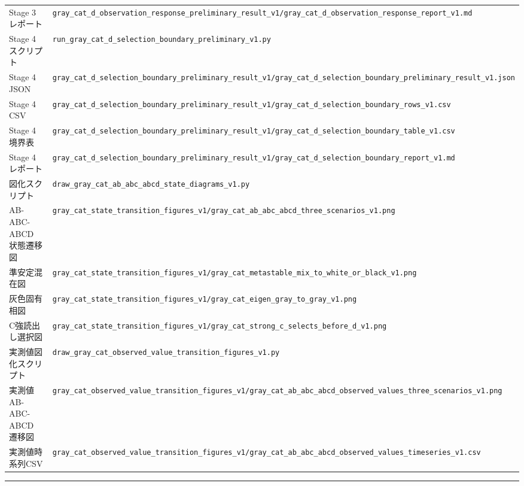\documentclass{article}
\begin{document}
{\begin{longtable}[]{@{}
  >{\raggedright\arraybackslash}p{}
  >{\raggedright\arraybackslash}p{}@{}}
Stage 3 レポート &
\texttt{gray\_cat\_d\_observation\_response\_preliminary\_result\_v1/gray\_cat\_d\_observation\_response\_report\_v1.md} \\
Stage 4 スクリプト &
\texttt{run\_gray\_cat\_d\_selection\_boundary\_preliminary\_v1.py} \\
Stage 4 JSON &
\texttt{gray\_cat\_d\_selection\_boundary\_preliminary\_result\_v1/gray\_cat\_d\_selection\_boundary\_preliminary\_result\_v1.json} \\
Stage 4 CSV &
\texttt{gray\_cat\_d\_selection\_boundary\_preliminary\_result\_v1/gray\_cat\_d\_selection\_boundary\_rows\_v1.csv} \\
Stage 4 境界表 &
\texttt{gray\_cat\_d\_selection\_boundary\_preliminary\_result\_v1/gray\_cat\_d\_selection\_boundary\_table\_v1.csv} \\
Stage 4 レポート &
\texttt{gray\_cat\_d\_selection\_boundary\_preliminary\_result\_v1/gray\_cat\_d\_selection\_boundary\_report\_v1.md} \\
図化スクリプト &
\texttt{draw\_gray\_cat\_ab\_abc\_abcd\_state\_diagrams\_v1.py} \\
AB-ABC-ABCD 状態遷移図 &
\texttt{gray\_cat\_state\_transition\_figures\_v1/gray\_cat\_ab\_abc\_abcd\_three\_scenarios\_v1.png} \\
準安定混在図 &
\texttt{gray\_cat\_state\_transition\_figures\_v1/gray\_cat\_metastable\_mix\_to\_white\_or\_black\_v1.png} \\
灰色固有相図 &
\texttt{gray\_cat\_state\_transition\_figures\_v1/gray\_cat\_eigen\_gray\_to\_gray\_v1.png} \\
C強読出し選択図 &
\texttt{gray\_cat\_state\_transition\_figures\_v1/gray\_cat\_strong\_c\_selects\_before\_d\_v1.png} \\
実測値図化スクリプト &
\texttt{draw\_gray\_cat\_observed\_value\_transition\_figures\_v1.py} \\
実測値 AB-ABC-ABCD 遷移図 &
\texttt{gray\_cat\_observed\_value\_transition\_figures\_v1/gray\_cat\_ab\_abc\_abcd\_observed\_values\_three\_scenarios\_v1.png} \\
実測値時系列CSV &
\texttt{gray\_cat\_observed\_value\_transition\_figures\_v1/gray\_cat\_ab\_abc\_abcd\_observed\_values\_timeseries\_v1.csv} \\
\end{longtable}
}

\begin{center}\rule{0.5\linewidth}{0.5pt}\end{center}
\end{document}
